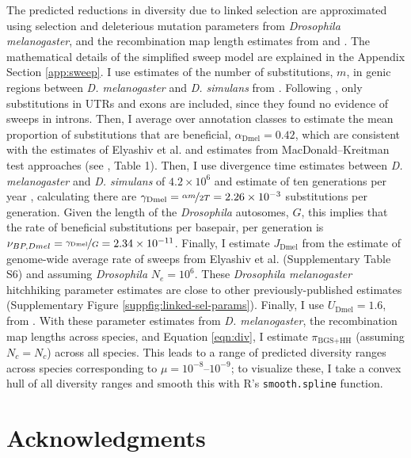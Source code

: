 \documentclass[11pt]{article}
\begin{document}
The predicted reductions in diversity due to linked selection are approximated
using selection and deleterious mutation parameters from \emph{Drosophila
melanogaster}, and the recombination map length estimates from
\textcite{Stapley2017-fs} and \textcite{Corbett-Detig2015-gt}. The mathematical
details of the simplified sweep model are explained in the Appendix Section
\ref{app:sweep}. I use estimates of the number of substitutions, $m$, in genic
regions between \emph{D.  melanogaster} and \emph{D. simulans} from
\textcite{Hu2013-pg}.  Following \textcite{Elyashiv2016-vt}, only substitutions
in UTRs and exons are included, since they found no evidence of sweeps in
introns. Then, I average over annotation classes to estimate the mean
proportion of substitutions that are beneficial, $\alpha_\text{Dmel}=0.42$,
which are consistent with the estimates of Elyashiv et al. and estimates from
MacDonald--Kreitman test approaches (see \cite{Eyre-Walker2006-li}, Table 1).
Then, I use divergence time estimates between \emph{D. melanogaster} and
\emph{D. simulans} of $4.2 \times 10^6$ and estimate of ten generations per
year \parencite{Obbard2012-on}, calculating there are $\gamma_\text{Dmel} =
\nicefrac{\alpha m}{2T} = 2.26 \times 10^{-3}$ substitutions per generation.
Given the length of the \emph{Drosophila} autosomes, $G$, this implies that the
rate of beneficial substitutions per basepair, per generation is $\nu_{BP,Dmel}
= \nicefrac{\gamma_\text{Dmel}}{G} = 2.34 \times 10^{-11}$. Finally, I estimate
$J_\text{Dmel}$ from the estimate of genome-wide average rate of sweeps from
Elyashiv et al. (Supplementary Table S6) and assuming \emph{Drosophila} $N_e =
10^6$. These \emph{Drosophila melanogaster} hitchhiking parameter estimates are
close to other previously-published estimates (Supplementary Figure
\ref{suppfig:linked-sel-params}). Finally, I use $U_\text{Dmel} = 1.6$, from
\textcite{Elyashiv2016-vt}. With these parameter estimates from \emph{D.
melanogaster}, the recombination map lengths across species, and Equation
\eqref{eqn:div}, I estimate $\pi_\text{BGS+HH}$ (assuming $N_c=N_c$) across all
species. This leads to a range of predicted diversity ranges across species
corresponding to $\mu=10^{-8}$--$10^{-9}$; to visualize these, I take a convex
hull of all diversity ranges and smooth this with R's \texttt{smooth.spline}
function.



\section*{Acknowledgments}
\end{document}
